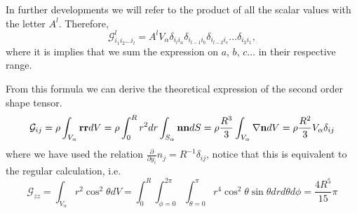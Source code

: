 In further developments we will refer to the product of all the scalar values with the letter $A^l$. 
Therefore, 
\begin{equation}
    \mathcal{G}_{i_1i_2\ldots i_l}^l 
    = A^l V_\alpha
    \delta_{i_l i_a}
    \delta_{i_{l-1} i_b}
    \delta_{i_{l-2} i_c}
    \ldots
    \delta_{i_2i_1},
    \label{eq:shapeT}
\end{equation}
where it is implies that we sum the expression on $a$, $b$, $c\ldots$ in their respective range. 

From this formula we can derive the theoretical expression of the second order shape tensor. 
\begin{equation*}
    \mathcal{G}_{ij} 
    = \rho \int_{V_\alpha} \textbf{r} \textbf{r} dV 
    = \rho \int_0^R r^2 dr \int_{S_\alpha} \textbf{n} \textbf{n}  dS 
    = \rho \frac{R^3}{3} \int_{V_\alpha} \mathbf{\nabla} \textbf{n} dV
    = \rho \frac{R^2}{3} V_\alpha \delta_{ij}
\end{equation*}
where we have used the relation $\frac{\partial}{\partial y_i}n_j = R^{-1} \delta_{ij}$, notice that this is equivalent to the regular calculation, i.e. 
\begin{equation*}
    \mathcal{G}_{zz} 
    = \int_{V_\alpha} r^2 \cos^2{\theta} dV 
    = \int_{0}^R \int_{\phi = 0}^{2\pi} \int_{\theta = 0}^{\pi} r^4 \cos^2{\theta} \sin{\theta} drd\theta d\phi
    = \frac{4R^5}{15}\pi
\end{equation*}

